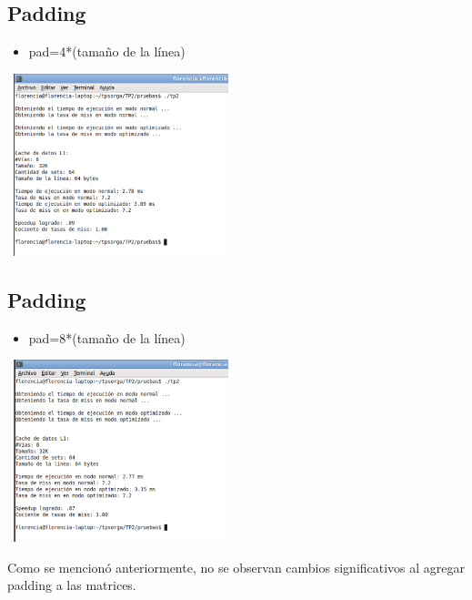 \documentclass[a4paper,10pt]{article}
\begin{document}
\subsection*{Padding}
\begin{itemize}
\item pad=4*(tama\~no de la l\'inea)\end{itemize}

\begin{center}
 \includegraphics[width=250px,height=200px,bb=0 0 328 277,scale=1]{./ssh2.png}
\end{center}


\subsection*{Padding}
\begin{itemize}
\item pad=8*(tama\~no de la l\'inea)
\end{itemize}

\begin{center}
 \includegraphics[width=250px,height=200px,bb=0 0 328 277,scale=1]{./ssh3.png}
\end{center}


Como se mencion\'o anteriormente, no se observan cambios significativos al agregar padding a las matrices.\\
\end{document}
